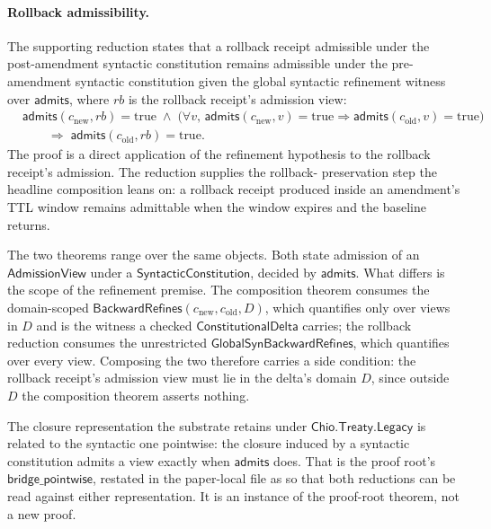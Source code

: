 \paragraph{Rollback admissibility.}
The supporting reduction 
states that a rollback receipt admissible under the post-amendment
syntactic constitution remains admissible under the pre-amendment
syntactic constitution given the global syntactic refinement witness
over $\mathsf{admits}$, where $\mathit{rb}$ is the rollback receipt's
admission view:
\[
  \begin{aligned}
    &\mathsf{admits}(c_{\text{new}}, \mathit{rb}) = \text{true}
      \;\wedge\; \bigl(\forall v,\,
         \mathsf{admits}(c_{\text{new}}, v) = \text{true}
         \Rightarrow \mathsf{admits}(c_{\text{old}}, v) = \text{true}\bigr) \\
    &\qquad \Rightarrow\; \mathsf{admits}(c_{\text{old}}, \mathit{rb}) = \text{true}.
  \end{aligned}
\]
The proof is a direct application of the refinement hypothesis to the
rollback receipt's admission. The reduction supplies the rollback-
preservation step the headline composition leans on: a rollback
receipt produced inside an amendment's TTL window remains admittable
when the window expires and the baseline returns.

The two theorems range over the same objects. Both state admission of
an $\mathsf{AdmissionView}$ under a $\mathsf{SyntacticConstitution}$,
decided by $\mathsf{admits}$. What differs is the scope of the
refinement premise. The composition theorem consumes the domain-scoped
$\mathsf{BackwardRefines}(c_{\text{new}}, c_{\text{old}}, D)$, which
quantifies only over views in $D$ and is the witness a checked
$\mathsf{ConstitutionalDelta}$ carries; the rollback reduction consumes
the unrestricted $\mathsf{GlobalSynBackwardRefines}$, which quantifies
over every view. Composing the two therefore carries a side condition:
the rollback receipt's admission view must lie in the delta's domain
$D$, since outside $D$ the composition theorem asserts nothing.

The closure representation the substrate retains under
$\mathsf{Chio.Treaty.Legacy}$ is related to the syntactic one
pointwise: the closure induced by a syntactic constitution admits a
view exactly when $\mathsf{admits}$ does. That is the proof root's
$\mathsf{bridge\_pointwise}$, restated in the paper-local
file as  so that both
reductions can be read against either representation. It is an
instance of the proof-root theorem, not a new proof.

